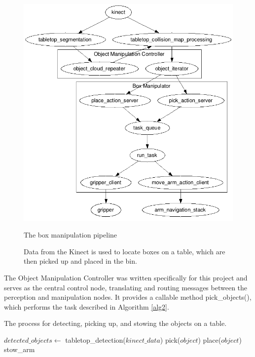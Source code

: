\documentclass[]{cwru} %
\begin{document}
\begin{figure}[h]
\centering
\includegraphics[width=6.0in]{box_manipulator_graph}
\caption{The box manipulation pipeline}
\caption*{Data from the Kinect is used to locate boxes on a table, which are 
then picked up and placed in the bin.}
\label{fig:box-manip}
\end{figure}

The Object Manipulation Controller was written specifically for this
project and serves as the central control node, translating and routing
messages between the perception and manipulation nodes. It provides a
callable method pick\_objects(), which performs the task described in
Algorithm \ref{alg2}.

\begin{algorithm}
\caption{The process for detecting, picking up, and stowing the objects
on a table.}
\label{alg2}
\begin{algorithmic}

\STATE $detected\_objects \gets$ tabletop\_detection($kinect\_data$)
    \STATE pick($object$)
    \STATE place($object$)
    \STATE stow\_arm
  \ENDIF
\ENDFOR
\end{algorithmic}
\end{algorithm}
\end{document}
